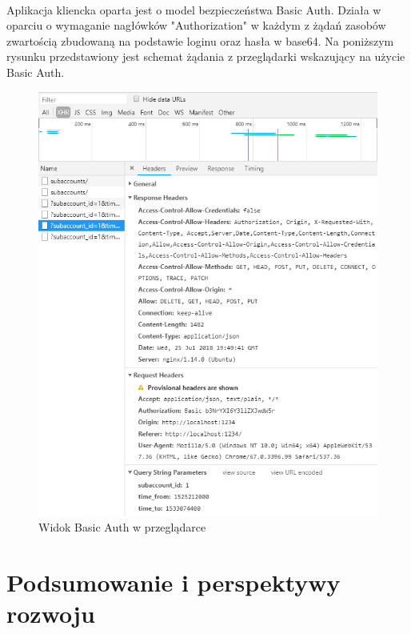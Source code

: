 \documentclass{article}
\begin{document}
\paragraph*{} Aplikacja kliencka oparta jest o model bezpieczeństwa Basic Auth. Działa w oparciu o wymaganie nagłówków "Authorization" w każdym z żądań zasobów zwartością zbudowaną na podstawie loginu oraz hasła w base64. Na poniższym rysunku przedstawiony jest schemat żądania z przeglądarki wskazujący na użycie Basic Auth.
\begin{figure}[H]
	\hspace*{-1cm}
	\includegraphics[scale=0.8]{assets/basicAuth.png}
	\caption[]{Widok Basic Auth w przeglądarce}
	\label{fig:basic }
\end{figure}
\section{Podsumowanie i perspektywy rozwoju}
\end{document}
